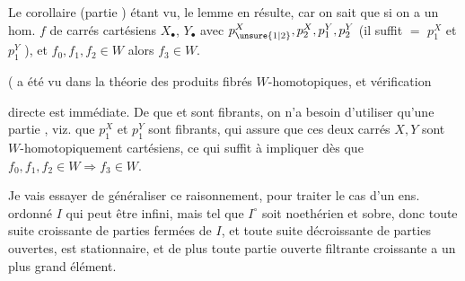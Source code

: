 Le corollaire (partie ) étant vu, le  lemme en résulte, car on sait que si on a un hom. $f$ de carrés cartésiens $X_\bullet$, $Y_\bullet$
avec $p_{\unsure{1|2}}^X,p_2^X,p_1^Y,p_2^Y$  (il suffit $=$ $p_1^X$ et $p_1^Y$ ), et $f_0,f_1,f_2\in W$ alors $f_3\in W$.

( a été vu dans la théorie des produits fibrés $W$-homotopiques, et  vérification

directe est immédiate. De   que
et
sont fibrants, on n'a besoin d'utiliser qu'une partie , viz. que $p_1^X$ et $p_1^Y$ sont fibrants, qui assure que ces deux carrés $X,Y$ sont $W$-homotopiquement cartésiens, ce qui suffit à impliquer dès que $f_0,f_1,f_2\in W\Rightarrow f_3\in W$.

Je vais essayer de généraliser ce raisonnement, pour traiter le cas d'un ens. ordonné $I$ qui peut être infini, mais tel que $I^\circ$ soit noethérien et sobre, donc toute  suite croissante de parties fermées de $I$, et toute suite décroissante de parties ouvertes, est stationnaire, et de plus toute partie ouverte filtrante croissante a un plus grand élément.

